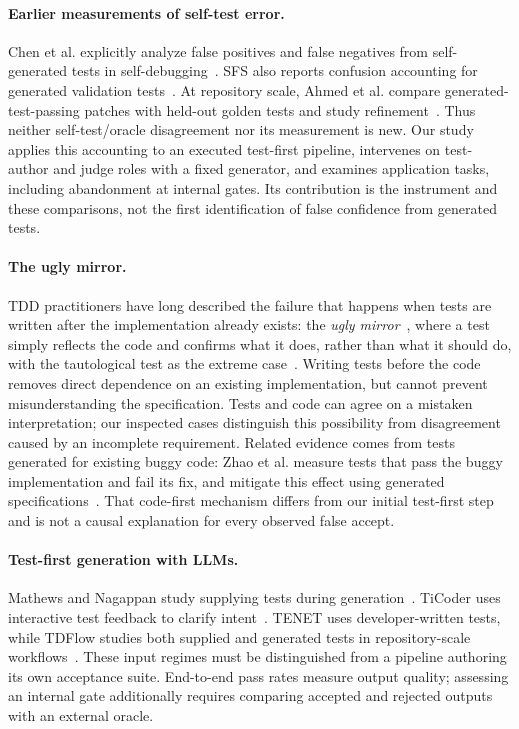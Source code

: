 \paragraph{Earlier measurements of self-test error.}
Chen et al. explicitly analyze false positives and false negatives from self-generated tests
in self-debugging~\cite{chen2025revisit}. SFS also reports confusion accounting for generated
validation tests~\cite{light2025sfs}. At repository scale, Ahmed et al. compare
generated-test-passing patches with held-out golden tests and study refinement~\cite{ahmed2025overfitting}.
Thus neither self-test/oracle disagreement nor its measurement is new. Our study applies
this accounting to an executed test-first pipeline, intervenes on test-author and judge
roles with a fixed generator, and examines application tasks, including abandonment at
internal gates. Its contribution is the instrument and these comparisons, not the first
identification of false confidence from generated tests.

\paragraph{The ugly mirror.}
TDD practitioners have long described the failure that happens when tests are written
after the implementation already exists: the \emph{ugly mirror}~\cite{rudolph2008uglymirror},
where a test simply reflects the code and confirms what it does, rather than what it should do,
with the tautological test as the extreme case~\cite{pereira2010ttdd}. Writing tests before the
code removes direct dependence on an existing implementation, but cannot prevent
misunderstanding the specification. Tests and code can agree on a mistaken interpretation;
our inspected cases distinguish this possibility from disagreement caused by an incomplete
requirement. Related evidence comes from tests generated for existing buggy code:
Zhao et al. measure tests that pass the buggy implementation and fail its fix, and mitigate
this effect using generated specifications~\cite{zhao2026misguidance}. That code-first
mechanism differs from our initial test-first step and is not a causal explanation for
every observed false accept.

\paragraph{Test-first generation with LLMs.}
Mathews and Nagappan study supplying tests during generation~\cite{mathews2024tdd}.
TiCoder uses interactive test feedback to clarify intent~\cite{fakhoury2024ticoder}.
TENET uses developer-written tests, while TDFlow studies both supplied and generated
tests in repository-scale workflows~\cite{sun2025tenet,tdflow2025}. These input regimes
must be distinguished from a pipeline authoring its own acceptance suite. End-to-end
pass rates measure output quality; assessing an internal gate additionally requires
comparing accepted and rejected outputs with an external oracle.

